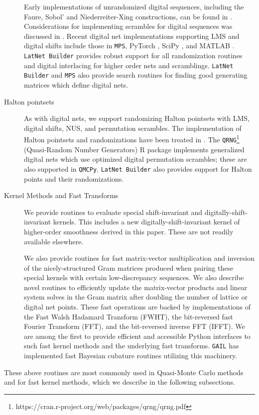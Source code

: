 \documentclass[acmsmall]{acmart}
\begin{document}
\begin{description}
    Early implementations of unrandomized digital sequences, including the Faure, Sobol' and Niederreiter-Xing constructions, can be found in \citep{fox1986algorithm,bratley1992implementation,bratley2003implementing,pirsic2002software}. Considerations for implementing scrambles for digital sequences was discussed in \citep{hong2003algorithm}. Recent digital net implementations supporting LMS and digital shifts  include those in \texttt{MPS}, PyTorch \citep{paszke2019pytorch}, SciPy \citep{virtanen2020scipy}, and MATLAB \citep{MATLAB}. \texttt{LatNet Builder} provides robust support for all randomization routines and digital interlacing for higher order nets and scramblings. \texttt{LatNet Builder} and \texttt{MPS} also provide search routines for finding good generating matrices which define digital nets. 
    \item[Halton pointsets] As with digital nets, we support randomizing Halton pointsets with LMS, digital shifts, NUS, and permutation scrambles. The implementation of Halton pointsets and randomizations have been treated in \citep{owen_halton,wang2000randomized}. The \texttt{QRNG}\footnote{https://cran.r-project.org/web/packages/qrng/qrng.pdf} (Quasi-Random Number Generators) R package \citep{qrng.software} implements generalized digital nets which use optimized digital permutation scrambles; these are also supported in \texttt{QMCPy}. \texttt{LatNet Builder} also provides support for Halton points and their randomizations. 
    \item[Kernel Methods and Fast Transforms] We provide routines to evaluate special shift-invariant and digitally-shift-invariant kernels. This includes a new digitally-shift-invariant kernel of higher-order smoothness derived in this paper. These are not readily available elsewhere. 
    
    We also provide routines for fast matrix-vector multiplication and inversion of the nicely-structured Gram matrices produced when pairing these special kernels with certain low-discrepancy sequences. We also describe novel routines to efficiently update the matrix-vector products and linear system solves in the Gram matrix after doubling the number of lattice or digital net points. These fast operations are backed by implementations of the Fast Walsh Hadamard Transform (FWHT), the bit-reversed fast Fourier Transform (FFT), and the bit-reversed inverse FFT (IFFT). We are among the first to provide efficient and accessible Python interfaces to such fast kernel methods and the underlying fast transforms. \texttt{GAIL} has implemented fast Bayesian cubature routines utilizing this machinery. 
\end{description}
These above routines are most commonly used in Quasi-Monte Carlo methods and for fast kernel methods, which we describe in the following subsections. 
\end{document}
